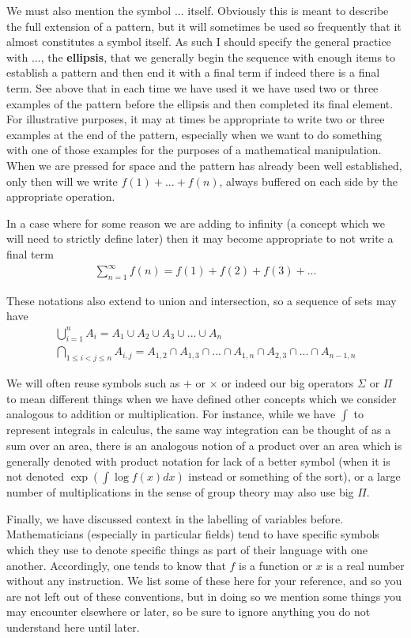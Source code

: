 \documentclass[11pt]{article}
\begin{document}
We must also mention the symbol $...$ itself. Obviously this is meant to describe the full extension of a pattern, but it will sometimes be used so frequently that it almost constitutes a symbol itself. As such I should specify the general practice with $...$, the \textbf{ellipsis}, that we generally begin the sequence with enough items to establish a pattern and then end it with a final term if indeed there is a final term. See above that in each time we have used it we have used two or three examples of the pattern before the ellipsis and then completed its final element. For illustrative purposes, it may at times be appropriate to write two or three examples at the end of the pattern, especially when we want to do something with one of those examples for the purposes of a mathematical manipulation. When we are pressed for space and the pattern has already been well established, only then will we write $f(1) + ... + f(n)$, always buffered on each side by the appropriate operation.

In a case where for some reason we are adding to infinity (a concept which we will need to strictly define later) then it may become appropriate to not write a final term \begin{gather*}
\sum_{n = 1}^\infty f(n) = f(1) + f(2) + f(3) + ...
\end{gather*}

These notations also extend to union and intersection, so a sequence of sets may have \begin{gather*}
\bigcup_{i=1}^n A_i = A_1 \cup A_2 \cup A_3 \cup ... \cup A_n \\
\bigcap_{1\le i < j \le n} A_{i,j} = A_{1,2} \cap A_{1,3} \cap ... \cap A_{1,n} \cap A_{2,3} \cap ... \cap A_{n-1,n}
\end{gather*}

We will often reuse symbols such as $+$ or $\times$ or indeed our big operators $\Sigma$ or $\Pi$ to mean different things when we have defined other concepts which we consider analogous to addition or multiplication. For instance, while we have $\int$ to represent integrals in calculus, the same way integration can be thought of as a sum over an area, there is an analogous notion of a product over an area which is generally denoted with product notation for lack of a better symbol (when it is not denoted $\exp(\int \log f(x) dx)$ instead or something of the sort), or a large number of multiplications in the sense of group theory may also use big $\Pi$.

Finally, we have discussed context in the labelling of variables before. Mathematicians (especially in particular fields) tend to have specific symbols which they use to denote specific things as part of their language with one another. Accordingly, one tends to know that $f$ is a function or $x$ is a real number without any instruction. We list some of these here for your reference, and so you are not left out of these conventions, but in doing so we mention some things you may encounter elsewhere or later, so be sure to ignore anything you do not understand here until later.
\end{document}
